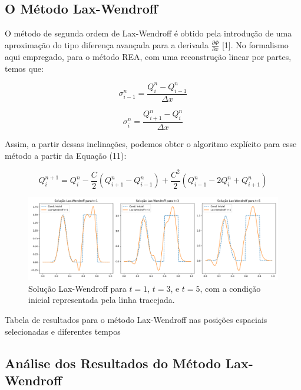 \subsection{O Método Lax-Wendroff}

O método de segunda ordem de Lax-Wendroff é obtido pela introdução de uma aproximação do tipo diferença avançada para a derivada $\frac{\partial \Phi}{\partial x}$ [1]. No formalismo aqui empregado, para o método REA, com uma reconstrução linear por partes, temos que:

\begin{equation}
\sigma_{i-1}^n = \frac{Q_i^n - Q_{i-1}^n}{\Delta x}
\end{equation}

\begin{equation}
\sigma_{i}^n = \frac{Q_{i+1}^n - Q_i^n}{\Delta x}
\end{equation}

Assim, a partir dessas inclinações, podemos obter o algoritmo explícito para esse método a partir da Equação (11):

\begin{equation}
Q_i^{n+1} = Q_i^n - \frac{C}{2} (Q_{i+1}^n - Q_{i-1}^n) + \frac{C^2}{2} (Q_{i-1}^n - 2 Q_i^n + Q_{i+1}^n)
\end{equation}

\begin{figure}[H]
    \centering
    \includegraphics[width=\textwidth]{code/images/Lax-Wendroff.png}
    \caption{Solução Lax-Wendroff para $t=1$, $t=3$, e $t=5$, com a condição inicial representada pela linha tracejada.}
\end{figure}

\begin{table}[H]
    \centering
    
    \caption{Tabela de resultados para o método Lax-Wendroff nas posições espaciais selecionadas e diferentes tempos}
    \label{tab:lax_wendroff}
\end{table}

\subsection{Análise dos Resultados do Método Lax-Wendroff}

